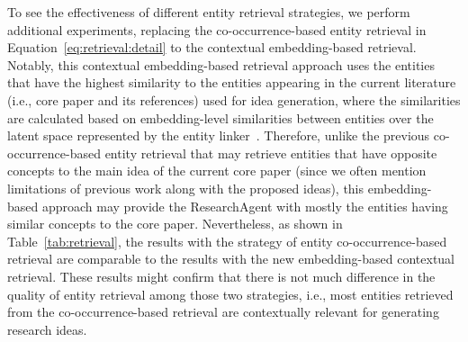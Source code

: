 To see the effectiveness of different entity retrieval strategies, we perform additional experiments, replacing the co-occurrence-based entity retrieval in Equation~\ref{eq:retrieval:detail} to the contextual embedding-based retrieval. Notably, this contextual embedding-based retrieval approach uses the entities that have the highest similarity to the entities appearing in the current literature (i.e., core paper and its references) used for idea generation, where the similarities are calculated based on embedding-level similarities between entities over the latent space represented by the entity linker~\cite{blink}. Therefore, unlike the previous co-occurrence-based entity retrieval that may retrieve entities that have opposite concepts to the main idea of the current core paper (since we often mention limitations of previous work along with the proposed ideas), this embedding-based approach may provide the ResearchAgent with mostly the entities having similar concepts to the core paper. Nevertheless, as shown in Table~\ref{tab:retrieval}, the results with the strategy of entity co-occurrence-based retrieval are comparable to the results with the new embedding-based contextual retrieval. These results might confirm that there is not much difference in the quality of entity retrieval among those two strategies, i.e., most entities retrieved from the co-occurrence-based retrieval are contextually relevant for generating research ideas. 





